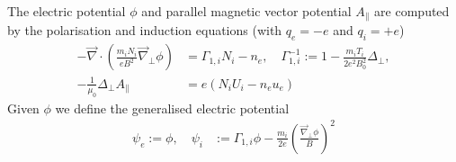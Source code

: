 The electric potential \(\phi\) and parallel magnetic vector potential \(A_\parallel\) are
computed by the polarisation and induction equations (with $q_e=-e$ and $q_i=+e$)
\begin{align}
 -\vec{\nabla} \cdot\left(\frac{m_iN_i}{e B^2} \vec{\nabla}_\perp \phi\right) &=  \Gamma_{1,i} N_i -n_e, \quad \Gamma_{1,i}^{-1} := 1-\frac{m_i T_i}{2e^2 B_0^2} \Delta_\perp , \\
  -\frac{1}{\mu_0} \Delta_\perp A_\parallel &= e\left(N_i U_i-n_e u_e \right)
  \label{eq:polarisation_dimensional}
\end{align}
Given $\phi$ we define the generalised electric potential
\begin{align}
    \psi_e := \phi,\quad \psi_i&:= \Gamma_{1,i} \phi - \frac{m_i }{2 e}\left(\frac{\vec \nabla_\perp\phi}{B}\right)^2
\end{align}

